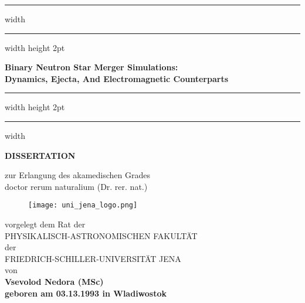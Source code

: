 \documentclass[
openright,
12pt, %
english,%
onehalfspacing, %
nolistspacing, %
nohyperref, %
headsepline, %
]{MastersDoctoralThesis} %
\begin{document}
\frontmatter %
\pagestyle{plain} %


\begin{titlepage}
    
    \begin{center}
        \centering
        {\hrule width \hsize \kern 1mm \hrule width \hsize height 2pt}
        \vspace{5mm}
        \Huge 
        \textbf{Binary Neutron Star Merger Simulations:\\ Dynamics, Ejecta, And Electromagnetic Counterparts}
        \vspace{5mm}
        {\hrule width \hsize height 2pt \kern 1mm  \hrule width \hsize }
        
        \vspace{1.5cm}
        
        \LARGE 
        \textbf{DISSERTATION} 
        
        \vspace{0.70cm}
        
        \large
        zur Erlangung des akamedischen Grades\\
        doctor rerum naturalium (Dr. rer. nat.)
        \vspace{0.8cm}
        
        \begin{figure}[!ht]
            \centering
            \texttt{[image: uni\_jena\_logo.png]}
        \end{figure}
        
        \vspace{0.8cm}
        vorgelegt dem Rat der \\
        \vspace{0.3cm}
        PHYSIKALISCH-ASTRONOMISCHEN FAKULT{\"A}T \\
        \vspace{0.3cm}
        der \\
        \vspace{0.3cm}
        FRIEDRICH-SCHILLER-UNIVERSIT{\"A}T JENA \\
        \vspace{0.3cm}
        von \\
        \vspace{0.3cm}
        \bf{Vsevolod Nedora (MSc)} \\
        \vspace{0.3cm}
        geboren am 03.13.1993 in Wladiwostok
        
    \end{center}
    
\end{titlepage}
\end{document}
